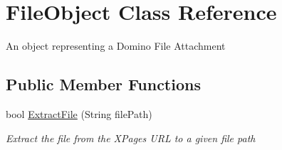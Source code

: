 \hypertarget{class_file_object}{}\section{File\+Object Class Reference}
\label{class_file_object}


An object representing a Domino File Attachment  


\subsection*{Public Member Functions}
\begin{DoxyCompactItemize}
\item 
bool \mbox{\hyperlink{class_file_object_ae21fac09c5ab2f9fac96a3f084cb9ddc}{Extract\+File}} (String file\+Path)
\begin{DoxyCompactList}\small\item\em Extract the file from the X\+Pages U\+RL to a given file path \end{DoxyCompactList}\end{DoxyCompactItemize}
